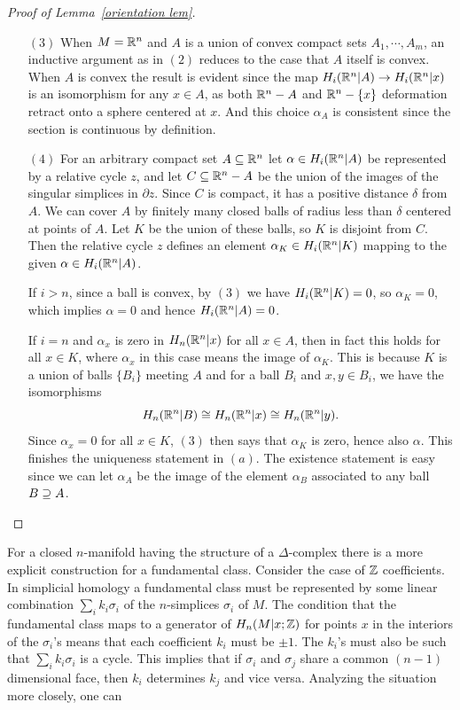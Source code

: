 \begin{proof}[Proof of Lemma~\ref{orientation lem}]
\begin{itemize}
\item[$(3)$]When $M=\mathbb{R}^n$ and $A$ is a union of convex compact sets $A_1,\cdots,A_m$, an inductive argument as in $(2)$ reduces to the case that $A$ itself is convex. When $A$ is convex the result is evident since the map $H_i(\mathbb{R}^n|A)\to H_i(\mathbb{R}^n|x)$ is an isomorphism for any $x\in A$, as both $\mathbb{R}^n-A$ and $\mathbb{R}^n-\{x\}$ deformation retract onto a sphere centered at $x$. And this choice $\alpha_A$ is consistent since the section is continuous by definition.
\item[$(4)$]For an arbitrary compact set $A\subseteq\mathbb{R}^n$ let $\alpha\in H_i(\mathbb{R}^n|A)$ be represented by a relative cycle $z$, and let $C\subseteq\mathbb{R}^n-A$ be the union of the images of the singular simplices in $\partial z$. Since $C$ is compact, it has a positive distance $\delta$ from $A$. We can cover $A$ by
finitely many closed balls of radius less than $\delta$ centered at points of $A$. Let $K$ be the union of these balls, so $K$ is disjoint from $C$. Then the relative cycle $z$ defines an element $\alpha_K\in H_i(\mathbb{R}^n|K)$ mapping to the given $\alpha\in H_i(\mathbb{R}^n|A)$.\par 
If $i>n$, since a ball is convex, by $(3)$ we have $H_i(\mathbb{R}^n|K)=0$, so $\alpha_K=0$, which implies $\alpha=0$ and hence $H_i(\mathbb{R}^n|A)=0$.\par
If $i=n$ and $\alpha_x$ is zero in $H_n(\mathbb{R}^n|x)$ for all $x\in A$, then in fact this holds for all $x\in K$, where $\alpha_x$ in this case means the image of $\alpha_K$. This is because $K$ is a union of balls $\{B_i\}$ meeting $A$ and for a ball $B_i$ and $x, y\in B_i$, we have the isomorphisms \[H_n(\mathbb{R}^n|B)\cong H_n(\mathbb{R}^n|x)\cong H_n(\mathbb{R}^n|y).\]
Since $\alpha_x=0$ for all $x\in K$, $(3)$ then says that $\alpha_K$ is zero, hence also $\alpha$. This finishes the uniqueness statement in $(a)$. The existence statement is easy since we can let $\alpha_A$ be the image of the element $\alpha_B$ associated to any ball $B\supseteq A$.
\end{itemize}
\end{proof}
For a closed $n$-manifold having the structure of a $\Delta$-complex there is a more explicit construction for a fundamental class. Consider the case of $\mathbb{Z}$ coefficients. In simplicial homology a fundamental class must be represented by some linear combination $\sum_ik_i\sigma_i$ of the $n$-simplices $\sigma_i$ of $M$. The condition that the fundamental class maps to a generator of $H_n(M|x;\mathbb{Z})$ for points $x$ in the interiors of the $\sigma_i$'s means that each coefficient $k_i$ must be $\pm1$. The $k_i$'s must also be such that $\sum_ik_i\sigma_i$ is a cycle. This implies that if $\sigma_i$ and $\sigma_j$ share a common $(n-1)$ dimensional face, then $k_i$ determines $k_j$ and vice versa. Analyzing the situation more closely, one can
